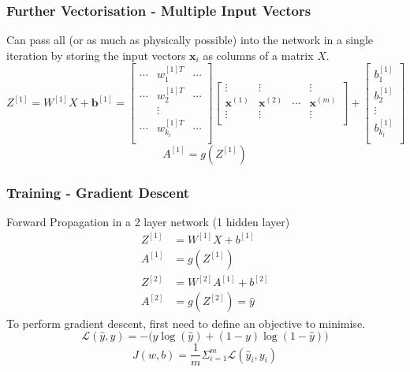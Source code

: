 \documentclass{beamer}
\newcommand{\mb}[1]{\mathbf{#1}}
\begin{document}
% 
% 
% 
% 
\begin{frame}
  \frametitle{Further Vectorisation - Multiple Input Vectors}
  Can pass all (or as much as physically possible) into the network in a single iteration by storing the input vectors $\mb{x}_i$ as columns of a matrix $X$.
  \begin{equation*}
    Z^{[1]} = W^{[1]} X + \mathbf{b}^{[1]} = 
    \begin{bmatrix}
      \cdots & w_{1}^{[1]T} & \cdots \\
      \cdots & w_{2}^{[1]T} & \cdots \\
      & \vdots       &  \\
      \cdots & w_{k_l}^{[1]T} & \cdots \\
    \end{bmatrix}
    \begin{bmatrix}
      \vdots & \vdots & & \vdots\\
      \mathbf{x}^{(1)} & \mathbf{x}^{(2)} &  \cdots & \mathbf{x}^{(m)}\\
      \vdots & \vdots & & \vdots\\
    \end{bmatrix}
    + 
    \begin{bmatrix}
      b_{1}^{[1]} \\
      b_{2}^{[1]} \\
      \vdots \\
      b_{k_l}^{[1]} \\
    \end{bmatrix}
  \end{equation*}
  \vspace*{1cm}
  \begin{equation*}
    A^{[1]} = g( Z^{[1]} )
  \end{equation*}
\end{frame}
% 
% 
% 
% 
\begin{frame}
  \frametitle{Training - Gradient Descent}
  Forward Propagation in a 2 layer network (1 hidden layer)
  \begin{align*}
    Z^{[1]} &= W^{[1]}X + b^{[1]}\\
    A^{[1]} &= g(Z^{[1]})\\
    Z^{[2]} &= W^{[2]}A^{[1]} + b^{[2]}\\
    A^{[2]} &= g(Z^{[2]}) = \hat{y}
  \end{align*}
  To perform gradient descent, first need to define an objective to minimise.
  \begin{equation*}
    \mathcal{L}(\hat{y}, y) = - \Big(y\log(\hat{y}) + (1-y)\log(1 - \hat{y})  \Big)
  \end{equation*}
  \begin{equation*}
    J(w,b) =\frac{1}{m} \Sigma_{i=1}^{m}\mathcal{L}(\hat{y}_i, y_i)
  \end{equation*}
\end{frame}
\end{document}
